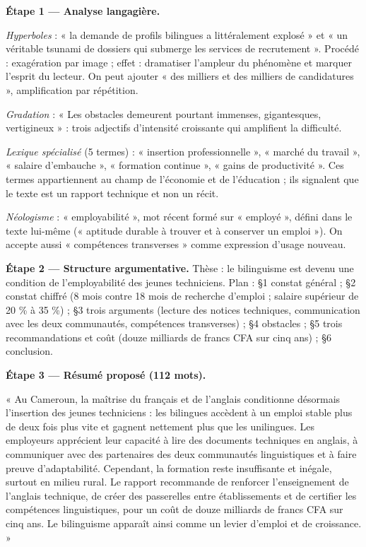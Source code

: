 \documentclass[11pt]{article}
\begin{document}
\begin{exoresolu}
\textbf{Étape 1 — Analyse langagière.}

\emph{Hyperboles} : « la demande de profils bilingues a littéralement explosé » et « un véritable tsunami de dossiers qui submerge les services de recrutement ». Procédé : exagération par image ; effet : dramatiser l'ampleur du phénomène et marquer l'esprit du lecteur. On peut ajouter « des milliers et des milliers de candidatures », amplification par répétition.

\emph{Gradation} : « Les obstacles demeurent pourtant immenses, gigantesques, vertigineux » : trois adjectifs d'intensité croissante qui amplifient la difficulté.

\emph{Lexique spécialisé} (5 termes) : « insertion professionnelle », « marché du travail », « salaire d'embauche », « formation continue », « gains de productivité ». Ces termes appartiennent au champ de l'économie et de l'éducation ; ils signalent que le texte est un rapport technique et non un récit.

\emph{Néologisme} : « employabilité », mot récent formé sur « employé », défini dans le texte lui-même (« aptitude durable à trouver et à conserver un emploi »). On accepte aussi « compétences transverses » comme expression d'usage nouveau.

\textbf{Étape 2 — Structure argumentative.} Thèse : le bilinguisme est devenu une condition de l'employabilité des jeunes techniciens. Plan : §1 constat général ; §2 constat chiffré (8 mois contre 18 mois de recherche d'emploi ; salaire supérieur de 20 \% à 35 \%) ; §3 trois arguments (lecture des notices techniques, communication avec les deux communautés, compétences transverses) ; §4 obstacles ; §5 trois recommandations et coût (douze milliards de francs CFA sur cinq ans) ; §6 conclusion.

\textbf{Étape 3 — Résumé proposé (112 mots).}

« Au Cameroun, la maîtrise du français et de l'anglais conditionne désormais l'insertion des jeunes techniciens : les bilingues accèdent à un emploi stable plus de deux fois plus vite et gagnent nettement plus que les unilingues. Les employeurs apprécient leur capacité à lire des documents techniques en anglais, à communiquer avec des partenaires des deux communautés linguistiques et à faire preuve d'adaptabilité. Cependant, la formation reste insuffisante et inégale, surtout en milieu rural. Le rapport recommande de renforcer l'enseignement de l'anglais technique, de créer des passerelles entre établissements et de certifier les compétences linguistiques, pour un coût de douze milliards de francs CFA sur cinq ans. Le bilinguisme apparaît ainsi comme un levier d'emploi et de croissance. »


\end{exoresolu}
\end{document}
